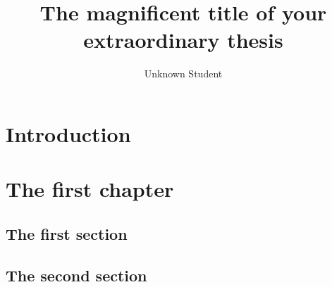 \documentclass{utee-thesis}
\institute{Institute of Latex}
\title{The magnificent title of your extraordinary thesis}
\author{Unknown Student}
\begin{document}
\maketitle
\tableofcontents

\chapter{Introduction}
\lipsum[1-2]
\chapter{The first chapter}
\lipsum[1]
\section{The first section}
\lipsum[2-4]
\section{The second section}
\lipsum[5-6]

\begin{abstract}
\lipsum[2-3]
\end{abstract}
\end{document}
